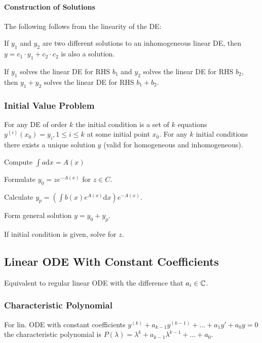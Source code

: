 \paragraph{Construction of Solutions}
The following follows from the linearity of the DE:
\begin{compactitem}
    \item If $y_1$ and $y_2$ are two different solutions to an inhomogeneous linear DE, then $y = c_1 \cdot y_1 + c_2 \cdot c_2$ is also a solution.
    \item If $y_1$ solves the linear DE for RHS $b_1$ and $y_2$ solves the linear DE for RHS $b_2$, then $y_1 + y_2$ solves the linear DE for RHS $b_1 + b_2$.
\end{compactitem}

\subsubsection{Initial Value Problem}
For any DE of order $k$ the initial condition is a set of $k$ equations $y^{(i)} (x_0) = y_i, 1 \le i \le k$ at some initial point $x_0$.  For any $k$ initial conditions there exists a unique solution $y$ (valid for homogeneous and inhomogeneous).

\begin{compactenum}
    \item Compute $\int a \mathrm{d}x = A(x)$
    \item Formulate $y_0 = z e^{-A(x)}$ for $z \in C$.
    \item Calculate $y_p = (\int b(x) e^{A(x)} \mathrm{d}x) e^{-A(x)}$.
    \item Form general solution $y = y_0 + y_p$.
    \item If initial condition is given, solve for $z$.
\end{compactenum}

\subsection{Linear ODE With Constant Coefficients}
Equivalent to regular linear ODE with the difference that $a_i \in \mathbb{C}$.

\subsubsection{Characteristic Polynomial}
For lin. ODE with constant coefficients $y^{(k)} + a_{k - 1}y^{(k - 1)} + \dots + a_1y' + a_0y = 0$ the characteristic polynomial is $P(\lambda) = \lambda^k + a_{k - 1} \lambda^{k - 1} + \dots + a_0$.

